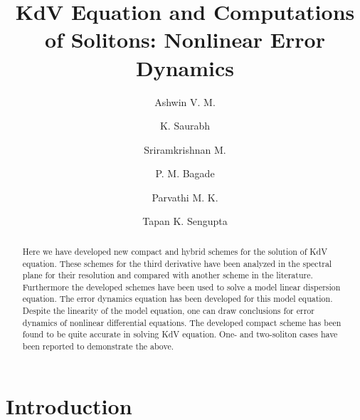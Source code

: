 \documentclass{svjour3}                    %
\begin{document}
\title{KdV Equation and Computations of Solitons: Nonlinear Error Dynamics}


\author{Ashwin V. M.\and K. Saurabh \and Sriramkrishnan M.\and  P. M. Bagade\and Parvathi M. K. \and Tapan K. Sengupta }




\maketitle

\begin{abstract}
Here we have developed new compact and hybrid schemes for the solution of KdV equation. These schemes for the third derivative have been analyzed 
in the spectral plane for their resolution and compared with another scheme in the literature. Furthermore the developed schemes have been used
to solve a model linear dispersion equation. The error dynamics equation has been developed for this model equation. Despite the linearity of the 
model equation, one can draw conclusions for error dynamics of nonlinear differential equations. The developed compact scheme has been found to be 
quite accurate in solving KdV equation. One- and two-soliton cases have been reported to demonstrate the above.

 
\end{abstract}



\section{Introduction}
\end{document}
